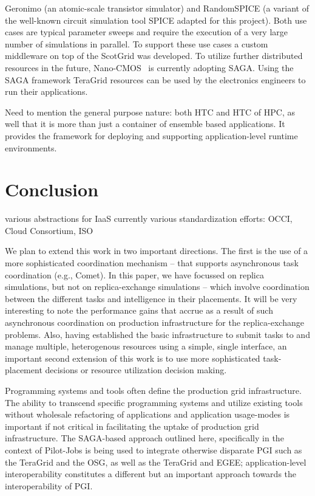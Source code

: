 \documentclass[conference,final]{IEEEtran}
\begin{document}
Geronimo (an atomic-scale transistor simulator) and RandomSPICE (a
variant of the well-known circuit simulation tool SPICE adapted for
this project). Both use cases are typical parameter sweeps and require
the execution of a very large number of simulations in parallel. To
support these use cases a custom middleware on top of the ScotGrid was
developed. To utilize further distributed resources in the future,
Nano-CMOS~\cite{nanocmos} is currently adopting SAGA. Using the SAGA
framework TeraGrid resources can be used by the electronics engineers
to run their applications.

Need to mention the general purpose nature: both HTC and HTC of HPC,
as well that it is more than just a container of ensemble based
applications.  It provides the framework for deploying and supporting
application-level runtime environments.

\section{Conclusion}

various abstractions for IaaS currently various standardization
efforts: OCCI, Cloud Consortium, ISO

We plan to extend this work in two important directions. The first is
the use of a more sophisticated coordination mechanism -- that
supports asynchronous task coordination (e.g., Comet). In this paper,
we have focussed on replica simulations, but not on replica-exchange
simulations -- which involve coordination between the different tasks
and intelligence in their placements.  It will be very interesting to
note the performance gains that accrue as a result of such
asynchronous coordination on production infrastructure for the
replica-exchange problems. Also, having established the basic
infrastructure to submit tasks to and manage multiple, heterogenous
resources using a simple, single interface, an important second
extension of this work is to use more sophisticated task-placement
decisions or resource utilization decision making.

Programming systems and tools often define the production grid
infrastructure.  The ability to transcend specific programming systems
and utilize existing tools without wholesale refactoring of
applications and application usage-modes is important if not critical
in facilitating the uptake of production grid infrastructure. The
SAGA-based approach outlined here, specifically in the context of
Pilot-Jobs is being used to integrate otherwise disparate PGI such as
the TeraGrid and the OSG, as well as the TeraGrid and EGEE;
application-level interoperability constitutes a different but an
important approach towards the interoperability of PGI.
\end{document}
